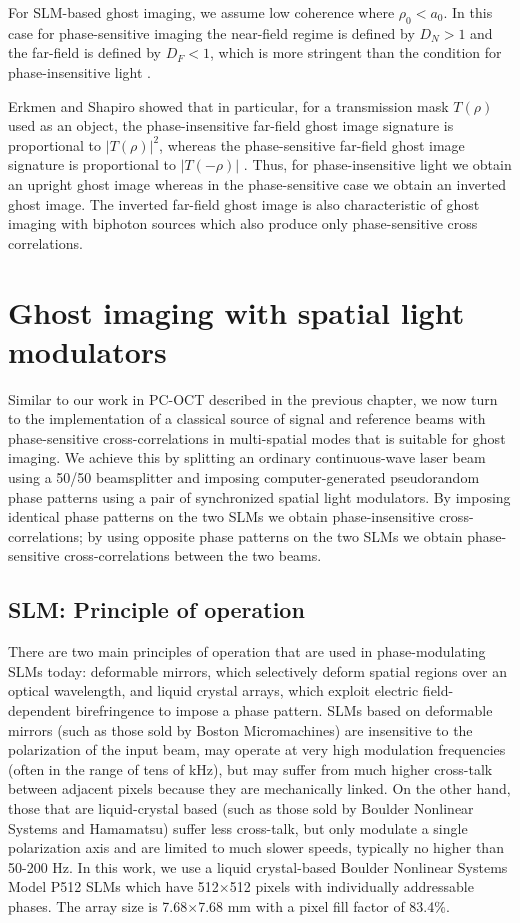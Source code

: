 For SLM-based ghost imaging, we assume low coherence where $\rho_0 < a_0$. In this case for phase-sensitive imaging the near-field regime is defined by $D_N > 1$ and the far-field is defined by $D_F < 1$, which is more stringent than the condition for phase-insensitive light \cite{erkmen-unified}.

Erkmen and Shapiro showed that in particular, for a transmission mask $T(\rho)$ used as an object, the phase-insensitive far-field ghost image signature is proportional to $|T(\rho)|^2$, whereas the phase-sensitive far-field ghost image signature is proportional to $|T(-\rho)|$ \cite{erkmen-unified}. Thus, for phase-insensitive light we obtain an upright ghost image whereas in the phase-sensitive case we obtain an inverted ghost image. The inverted far-field ghost image is also characteristic of ghost imaging with biphoton sources which also produce only phase-sensitive cross correlations.


\section{Ghost imaging with spatial light modulators}

Similar to our work in PC-OCT described in the previous chapter, we now turn to the implementation of a classical source of signal and reference beams with phase-sensitive cross-correlations in multi-spatial modes that is suitable for ghost imaging. We achieve this by splitting an ordinary continuous-wave laser beam using a 50/50 beamsplitter and imposing computer-generated pseudorandom phase patterns using a pair of synchronized spatial light modulators. By imposing identical phase patterns on the two SLMs we obtain phase-insensitive cross-correlations; by using opposite phase patterns on the two SLMs we obtain phase-sensitive cross-correlations between the two beams.

\subsection{SLM: Principle of operation}

There are two main principles of operation that are used in phase-modulating SLMs today: deformable mirrors, which selectively deform spatial regions over an optical wavelength, and liquid crystal arrays, which exploit electric field-dependent birefringence to impose a phase pattern. SLMs based on deformable mirrors (such as those sold by Boston Micromachines) are insensitive to the polarization of the input beam, may operate at very high modulation frequencies (often in the range of tens of kHz), but may suffer from much higher cross-talk between adjacent pixels because they are mechanically linked. On the other hand, those that are liquid-crystal based (such as those sold by Boulder Nonlinear Systems and Hamamatsu) suffer less cross-talk, but only modulate a single polarization axis and are limited to much slower speeds, typically no higher than 50-200 Hz. In this work, we use a liquid crystal-based Boulder Nonlinear Systems Model P512 SLMs which have 512$\times$512 pixels with individually addressable phases. The array size is 7.68$\times$7.68 mm with a pixel fill factor of 83.4\%.


